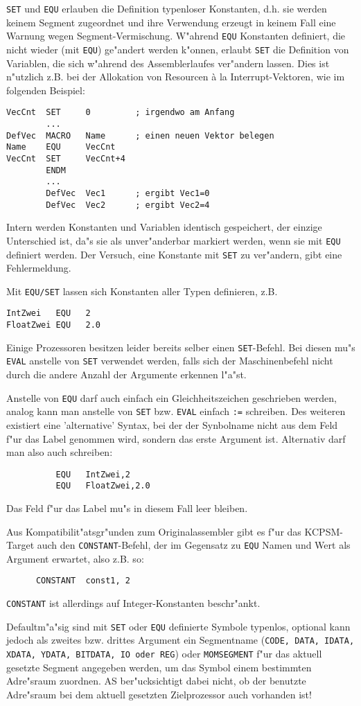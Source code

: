 \documentclass[12pt,a4paper,twoside]{report}
\newcommand{\tty}[1]{{\tt #1}}
\begin{document}
\tty{SET} und \tty{EQU} erlauben die Definition typenloser Konstanten, d.h. sie
werden keinem Segment zugeordnet und ihre Verwendung erzeugt in keinem
Fall eine Warnung wegen Segment-Vermischung.  W"ahrend \tty{EQU} Konstanten
definiert, die nicht wieder (mit \tty{EQU}) ge"andert werden k"onnen, erlaubt
\tty{SET} die Definition von Variablen, die sich w"ahrend des Assemblerlaufes
ver"andern lassen.  Dies ist n"utzlich z.B. bei der Allokation von
Resourcen \`a la Interrupt-Vektoren, wie im folgenden Beispiel:
\begin{verbatim}
VecCnt  SET     0         ; irgendwo am Anfang
        ...
DefVec  MACRO   Name      ; einen neuen Vektor belegen
Name    EQU     VecCnt
VecCnt  SET     VecCnt+4
        ENDM
        ...
        DefVec  Vec1      ; ergibt Vec1=0
        DefVec  Vec2      ; ergibt Vec2=4
\end{verbatim}
Intern werden Konstanten und Variablen identisch gespeichert, der
einzige Unterschied ist, da"s sie als unver"anderbar markiert werden, wenn
sie mit \tty{EQU} definiert werden.  Der Versuch, eine Konstante mit
\tty{SET} zu ver"andern, gibt eine Fehlermeldung.
\par
Mit \tty{EQU/SET} lassen sich Konstanten aller Typen definieren, z.B.
\begin{verbatim}
IntZwei   EQU   2
FloatZwei EQU   2.0
\end{verbatim}
Einige Prozessoren besitzen leider bereits selber einen \tty{SET}-Befehl.
Bei diesen mu"s \tty{EVAL} anstelle von \tty{SET} verwendet werden, falls
sich der Maschinenbefehl nicht durch die andere Anzahl der Argumente 
erkennen l"a"st.
\par
Anstelle von \tty{EQU} darf auch einfach ein Gleichheitszeichen geschrieben
werden, analog kann man anstelle von \tty{SET} bzw. \tty{EVAL}
einfach \tty{:=} schreiben.  Des weiteren existiert eine
'alternative' Syntax, bei der der Synbolname nicht aus dem Feld
f"ur das Label genommen wird, sondern das erste Argument ist.
Alternativ darf man also auch schreiben:
\begin{verbatim}
          EQU   IntZwei,2
          EQU   FloatZwei,2.0
\end{verbatim}
Das Feld f"ur das Label mu"s in diesem Fall leer bleiben.
\par
Aus Kompatibilit"atsgr"unden zum Originalassembler gibt es f"ur das
KCPSM-Target auch den {\tt CONSTANT}-Befehl, der im Gegensatz zu {\tt EQU}
Namen und Wert als Argument erwartet, also z.B. so:
\begin{verbatim}
      CONSTANT  const1, 2
\end{verbatim}
{\tt CONSTANT} ist allerdings auf Integer-Konstanten beschr"ankt.
\par
Defaultm"a"sig sind mit \tty{SET} oder \tty{EQU} definierte Symbole
typenlos, optional kann jedoch als zweites bzw. drittes Argument ein
Segmentname (\tty{CODE, DATA, IDATA, XDATA, YDATA, BITDATA, IO oder REG})
oder \tty{MOMSEGMENT} f"ur das aktuell gesetzte Segment angegeben werden,
um das Symbol einem bestimmten Adre"sraum zuordnen.  AS ber"ucksichtigt
dabei nicht, ob der benutzte Adre"sraum bei dem aktuell gesetzten
Zielprozessor auch vorhanden ist!
\end{document}
